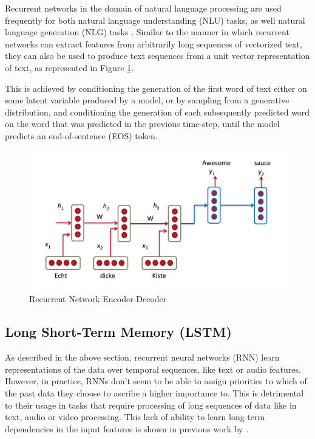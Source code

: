 Recurrent networks in the domain of natural language processing are used frequently for both natural language understanding (NLU) tasks, as well natural language generation (NLG) tasks \citep{mikolov2010recurrent}. Similar to the manner in which recurrent networks can extract features from arbitrarily long sequences of vectorized text, they can also be used to produce text sequences from a unit vector representation of text, as represented in Figure \ref{fig:rnn-nmt}.

This is achieved by conditioning the generation of the first word of text either on some latent variable produced by a model, or by sampling from a generative distribution, and conditioning the generation of each subsequently predicted word on the word that was predicted in the previous time-step, until the model predicts an end-of-sentence (EOS) token.

\begin{figure}[ht]
	\centering
	\includegraphics[width=\textwidth]{images/rnn-nmt}
	\caption{\label{fig:rnn-nmt} Recurrent Network Encoder-Decoder}
\end{figure}


\subsection{Long Short-Term Memory (LSTM)}

As described in the above section, recurrent neural networks (RNN) learn representations of the data over temporal sequences, like text or audio features. However, in practice, RNNs don't seem to be able to assign priorities to which of the past data they choose to ascribe a higher importance to. This is detrimental to their usage in tasks that require processing of long sequences of data like in text, audio or video processing. This lack of ability to learn long-term dependencies in the input features is shown in previous work by \cite{bengio1994learning}.

